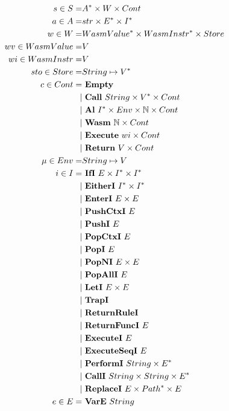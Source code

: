 \begin{align*}
%
  s \in S =& \seq A \times W \times Cont \\
%
  a \in A =& str \times \seq E \times \seq I \\
%
  w \in W =& \seq{WasmValue} \times \seq{WasmInstr} \times Store \\
  wv \in WasmValue =& V \\
  wi \in WasmInstr =& V \\
%
  sto \in Store =& String \mapsto \seq V \\
%
  c \in Cont =& ~ \mt \\
    | & ~ \call ~ String \times \seq V \times Cont \\
    | & ~ \al ~ \seq I \times Env \times \mathbb N \times Cont \\
    | & ~ \wasm ~ \mathbb N \times Cont \\
    | & ~ \exe ~ wi \times Cont \\
    | & ~ \ret ~ V \times Cont \\
%
  \mu \in Env =& String \mapsto V \\
%
  i \in I =& ~ \ifi ~ E \times \seq I \times \seq I \\
    | & ~ \eitheri ~ \seq I \times \seq I \\
    | & ~ \enteri ~ E \times E \\
    | & ~ \pushctxi ~ E \\
    | & ~ \pushi ~ E \\
    | & ~ \popctxi ~ E \\
    | & ~ \popi ~ E \\
    | & ~ \popni ~ E \times E \\
    | & ~ \popalli ~ E \\
    | & ~ \leti ~ E \times E \\
    | & ~ \trapi \\
    | & ~ \returnrulei \\
    | & ~ \returnfunci ~ E \\
    | & ~ \executei ~ E \\
    | & ~ \executeseqi ~ E \\
    | & ~ \performi ~ String \times \seq{E} \\
    | & ~ \calli ~ String \times String \times \seq{E} \\
    | & ~ \replacei ~ E \times \seq{Path} \times E \\
%
  e \in E =& ~ \vare ~ String \\

\end{align*}
